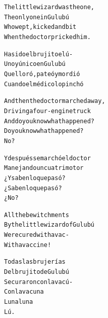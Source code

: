 \documentclass[11pt,a4paper]{article}
\begin{document}
\begin{parcolumns}{2}
\colplacechunks

\colchunk
{
\begin{alltt}\normalfont
The little wizard was the one,
The only one in Gulubú
Who wept, kicked and bit
When the doctor pricked him.
\end{alltt}
}

\colchunk
{
\begin{alltt}\normalfont
Ha sido el brujito el ú-
Uno y único en Gulubú
Que lloró, pateó y mordió
Cuando el médico lo pinchó
\end{alltt}
}

\colplacechunks

\colchunk
{
\begin{alltt}\normalfont
And then the doctor marched away,
Driving a four-engine truck
And do you know what happened?
Do you know what happened?
No?
\end{alltt}
}

\colchunk
{
\begin{alltt}\normalfont
Y después se marchó el doctor
Manejando un cuatrimotor
¿Y saben lo que pasó?
¿Saben lo que pasó?
¿No?
\end{alltt}
}

\colplacechunks

\colchunk
{
\begin{alltt}\normalfont
All the bewitchments
By the little wizard of Gulubú
Were cured with a vac-
With a vaccine!
\end{alltt}
}

\colchunk
{
\begin{alltt}\normalfont
Todas las brujerías
Del brujito de Gulubú
Se curaron con la vacú-
Con la vacuna
Luna luna
Lú.
\end{alltt}
}

\colplacechunks

\end{parcolumns}

\clearpage

\end{document}
